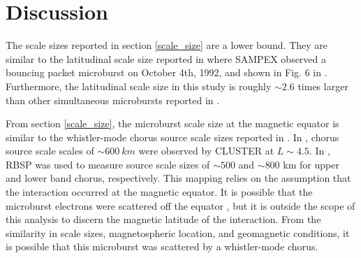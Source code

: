 \documentclass[draft,linenumbers]{agujournal}
\begin{document}

\section{Discussion} \label{discussion}
The scale sizes reported in section \ref{scale_size} are a lower bound. They are similar to the latitudinal scale size reported in \citet{Blake96} where SAMPEX observed a bouncing packet microburst on October 4th, 1992, and shown in Fig. 6 in \citet{Blake96}. Furthermore, the latitudinal scale size in this study is roughly $\sim 2.6$ times larger than other simultaneous microbursts reported in \citet{Crew16}.

From section \ref{scale_size}, the microburst scale size at the magnetic equator is similar to the whistler-mode chorus source scale sizes reported in \citet{Agapitov11b, Agapitov17a}. In \citet{Agapitov11b}, chorus source scale scales of $\sim 600 \ km$ were observed by CLUSTER at $L \sim 4.5$. In \citet{Agapitov17a}, RBSP was used to measure source scale sizes of $\sim 500$ and $\sim 800$ km for upper and lower band chorus, respectively. This mapping relies on the assumption that the interaction occurred at the magnetic equator. It is possible that the microburst electrons were scattered off the equator \citep{Lorentzen01b}, but it is outside the scope of this analysis to discern the magnetic latitude of the interaction. From the similarity in scale sizes, magnetospheric location, and geomagnetic conditions, it is possible that this microburst was scattered by a whistler-mode chorus.
\end{document}
